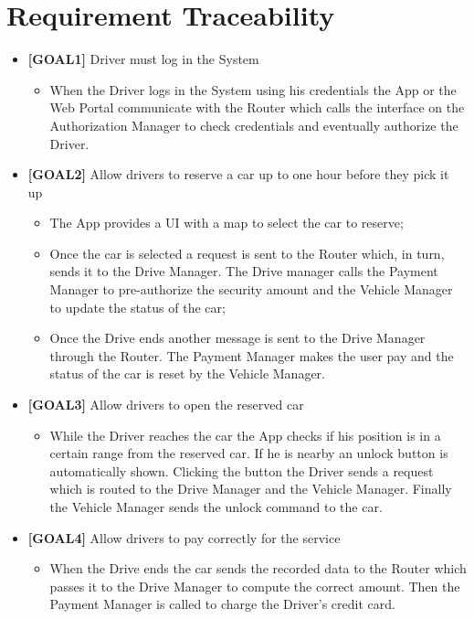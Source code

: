 \section{Requirement Traceability}

\begin{itemize}
\item \textbf{[GOAL1]} Driver must log in the System 
	\begin{itemize}
	\item When the Driver logs in the System using his credentials the App or the Web Portal communicate with the Router which calls the interface on the Authorization Manager to check credentials and eventually authorize the Driver.
	\end{itemize}
\item \textbf{[GOAL2]} Allow drivers to reserve a car up to one hour before they pick it up
	\begin{itemize}
	\item The App provides a UI with a map to select the car to reserve;
	\item Once the car is selected a request is sent to the Router which, in turn, sends it to the Drive Manager. The Drive manager calls the Payment Manager to pre-authorize the security amount and the Vehicle Manager to update the status of the car;
	\item Once the Drive ends another message is sent to the Drive Manager through the Router. The Payment Manager makes the user pay and the status of the car is reset by the Vehicle Manager.
	\end{itemize}
\item \textbf{[GOAL3]} Allow drivers to open the reserved car
	\begin{itemize}
	\item While the Driver reaches the car the App checks if his position is in a certain range from the reserved car. If he is nearby an unlock button is automatically shown. Clicking the button the Driver sends a request which is routed to the Drive Manager and the Vehicle Manager. Finally the Vehicle Manager sends the unlock command to the car.
	\end{itemize}
\item \textbf{[GOAL4]} Allow drivers to pay correctly for the service
	\begin{itemize}
	\item When the Drive ends the car sends the recorded data to the Router which passes it to the Drive Manager to compute the correct amount. Then the Payment Manager is called to charge the Driver's credit card.

\end{itemize}
\end{itemize}
